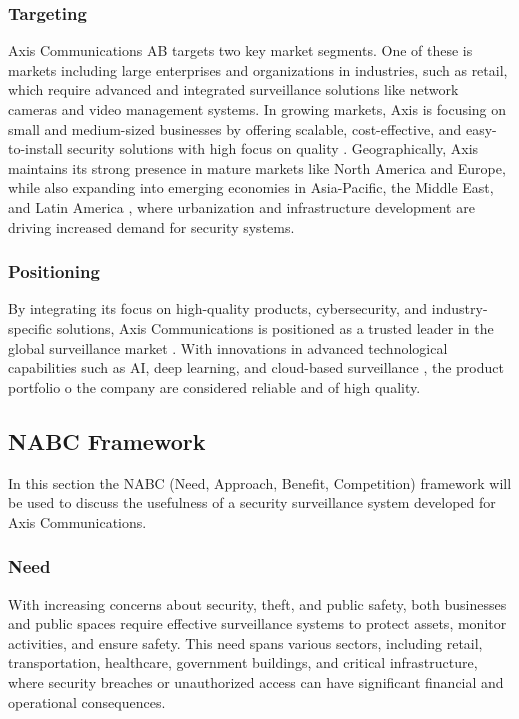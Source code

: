 \documentclass{article}
\begin{document}
\subsubsection{Targeting}
Axis Communications AB targets two key market segments. One of these is markets including large enterprises and organizations in industries, such as retail, which require advanced and integrated surveillance solutions like network cameras and video management systems. In growing markets, Axis is focusing on small and medium-sized businesses by offering scalable, cost-effective, and easy-to-install security solutions with high focus on quality \cite{axis_website}. Geographically, Axis maintains its strong presence in mature markets like North America and Europe, while also expanding into emerging economies in Asia-Pacific, the Middle East, and Latin America \cite{axis_about}, where urbanization and infrastructure development are driving increased demand for security systems.

\subsubsection{Positioning}
By integrating its focus on high-quality products, cybersecurity, and industry-specific solutions, Axis Communications is positioned as a trusted leader in the global surveillance market \cite{mckinsey2023}. With innovations in advanced technological capabilities such as AI, deep learning, and cloud-based surveillance \cite{axis_about}, the product portfolio o the company are considered reliable and of high quality.

\subsection{NABC Framework}
In this section the NABC (Need, Approach, Benefit, Competition) framework will be used to discuss the usefulness of a security surveillance system developed for Axis Communications.

\subsubsection{Need}
With increasing concerns about security, theft, and public safety, both businesses and public spaces require effective surveillance systems to protect assets, monitor activities, and ensure safety. This need spans various sectors, including retail, transportation, healthcare, government buildings, and critical infrastructure, where security breaches or unauthorized access can have significant financial and operational consequences. 
\end{document}
